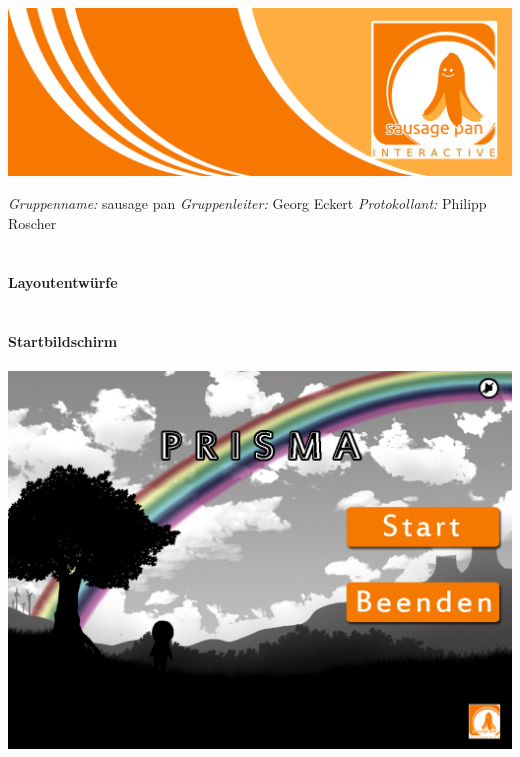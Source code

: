 \documentclass[10pt,a4paper,notitlepage]{report}
\author{Sausage Pan}
\begin{document}
	\newcommand{\Eins}[1]{\color{orange}\textbf{{\Large#1}}} %
	\newcommand{\Zwei}[1]{\color{orange}\textbf{{\large#1}}} %
	\newcommand{\Drei}[1]{\color{orange}{\normalsize#1}} %
	\newcommand{\Text}{\color{schwarz}} %
	\newcommand{\Fusszeile}
	{\textit{{\footnotesize Eckert, Georg - Roscher, Philipp - Krien, Alexandra - Sinakow, Sergej - Blasberg, Bettina - Groß, Stephanie Sara}}} %
	\marginpar{\vspace{3.0mm} \color{orange}\rule{0.8mm}{53.3mm} \\[3mm] \color{hellorange}\rule{0.8mm}{170mm}}
	\begin{center}
		\includegraphics[width=160mm]{header2}
	\end{center}
	\color{orange} \textit{Gruppenname:} \color{schwarz}sausage pan \color{orange} \textit{Gruppenleiter:} \color{schwarz}Georg Eckert   \color{orange} \textit{Protokollant:} \color{schwarz}Philipp Roscher\\
	\\
	\\
	\Eins{Layoutentwürfe}\\
	\\
	\\
	\Zwei{Startbildschirm}\\
	\\
	\includegraphics[width=1\textwidth]{png/startbildschirm.jpg}\
\end{document}

